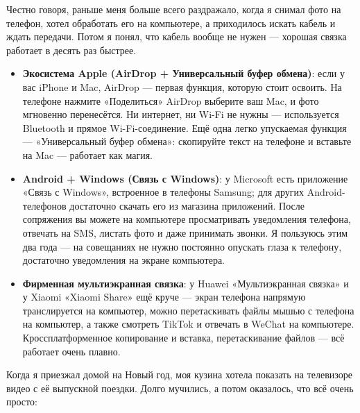 


Честно говоря, раньше меня больше всего раздражало, когда я снимал фото на телефон, хотел обработать его на компьютере, а приходилось искать кабель и ждать передачи. Потом я понял, что кабель вообще не нужен — хорошая связка работает в десять раз быстрее.

\begin{itemize}
  \item \textbf{Экосистема Apple (AirDrop + Универсальный буфер обмена)}: если у вас iPhone и Mac, AirDrop — первая функция, которую стоит освоить. На телефоне нажмите «Поделиться» AirDrop выберите ваш Mac, и фото мгновенно перенесётся. Ни интернет, ни Wi-Fi не нужны — используется Bluetooth и прямое Wi-Fi-соединение. Ещё одна легко упускаемая функция — «Универсальный буфер обмена»: скопируйте текст на телефоне и вставьте на Mac — работает как магия.
  \item \textbf{Android + Windows (Связь с Windows)}: у Microsoft есть приложение «Связь с Windows», встроенное в телефоны Samsung; для других Android-телефонов достаточно скачать его из магазина приложений. После сопряжения вы можете на компьютере просматривать уведомления телефона, отвечать на SMS, листать фото и даже принимать звонки. Я пользуюсь этим два года — на совещаниях не нужно постоянно опускать глаза к телефону, достаточно уведомления на экране компьютера.
  \item \textbf{Фирменная мультиэкранная связка}: у Huawei «Мультиэкранная связка» и у Xiaomi «Xiaomi Share» ещё круче — экран телефона напрямую транслируется на компьютер, можно перетаскивать файлы мышью с телефона на компьютер, а также смотреть TikTok и отвечать в WeChat на компьютере. Кроссплатформенное копирование и вставка, перетаскивание файлов — всё работает очень плавно.
\end{itemize}


Когда я приезжал домой на Новый год, моя кузина хотела показать на телевизоре видео с её выпускной поездки. Долго мучились, а потом оказалось, что всё очень просто:

